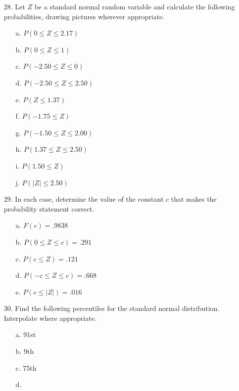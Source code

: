 \documentclass[letterpaper,12pt]{article}
\begin{document}
\maketitle

\begin{enumerate}
  \item[28.]
    Let $Z$ be a standard normal random variable and calculate the following probabilities, drawing pictures wherever appropriate.
    \begin{enumerate}
      \item[a.]
        $P(0 \le Z \le 2.17)$
      \item[b.]
        $P(0 \le Z \le 1)$
      \item[c.]
        $P(-2.50 \le Z \le 0)$
      \item[d.]
        $P(-2.50 \le Z \le 2.50)$
      \item[e.]
        $P(Z \le 1.37)$
      \item[f.]
        $P(-1.75 \le Z)$
      \item[g.]
        $P(-1.50 \le Z \le 2.00)$
      \item[h.]
        $P(1.37 \le Z \le 2.50)$
      \item[i.]
        $P(1.50 \le Z)$
      \item[j.]
        $P(|Z| \le 2.50)$
    \end{enumerate}
  \item[29.]
    In each case, determine the value of the constant $c$ that makes the probability statement correct.
    \begin{enumerate}
      \item[a.]
        $F(c) = .9838$
      \item[b.]
        $P(0 \le Z \le c) = .291$
      \item[c.]
        $P(c \le Z) = .121$
      \item[d.]
        $P(-c \le Z \le c) = .668$
      \item[e.]
        $P(c \le |Z|) = .016$
    \end{enumerate}
  \item[30.]
    Find the following percentiles for the standard normal distribution. Interpolate where appropriate.
    \begin{enumerate}
      \item[a.]
        91st
      \item[b.]
        9th
      \item[c.]
        75th
      \item[d.]

\end{enumerate}
\end{enumerate}
\end{document}
